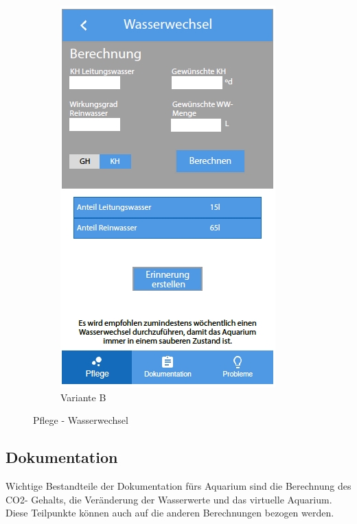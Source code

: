 \begin{figure}
\begin{subfigure}[b]{0.5\textwidth}
		\includegraphics[width=\textwidth]{wasserwechsel2}
		\caption{Variante B}
		\label{care:ww:b}
	\end{subfigure}	
	\caption{Pflege - Wasserwechsel}
	\label{care:ww}
\end{figure}

\subsection{Dokumentation}
Wichtige Bestandteile der Dokumentation fürs Aquarium sind die Berechnung des CO2- Gehalts, die Veränderung der Wasserwerte und das virtuelle Aquarium. Diese Teilpunkte können auch auf die anderen Berechnungen bezogen werden. 

